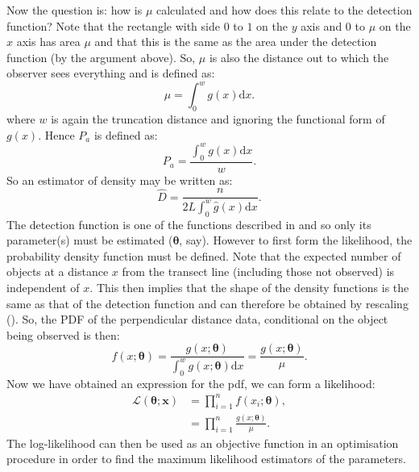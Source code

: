 Now the question is: how is $\mu$ calculated and how does this relate to the detection function? Note that the rectangle with side $0$ to $1$ on the $y$ axis and $0$ to $\mu$ on the $x$ axis has area $\mu$ and that this is the same as the area under the detection function (by the argument above). So, $\mu$ is also the distance out to which the observer sees everything and is defined as:
\begin{equation}
\mu = \int_0^w g(x) \text{d}x.
\label{ds-lt-mu-def}
\end{equation}
where $w$ is again the truncation distance and ignoring the functional form of $g(x)$. Hence $P_a$ is defined as:
\begin{equation*}
P_a = \frac{\int_0^w g(x) \text{d}x}{w}.
\end{equation*}
So an estimator of density may be written as:
\begin{equation*}
\hat{D}=\frac{n}{2L \int_0^w \hat{g}(x) \text{d}x}.
\end{equation*}
The detection function is one of the functions described in  and so only its parameter(s) must be estimated ($\bm{\theta}$, say). However to first form the likelihood, the probability density function must be defined. Note that the expected number of objects at a distance $x$ from the transect line (including those not observed) is independent of $x$. This then implies that the shape of the density functions is the same as that of the detection function and can therefore be obtained by rescaling (\cite[p. 38]{IDS}). So, the PDF of the perpendicular distance data, conditional on the object being observed is then:
\begin{equation*}
f(x;\bm{\theta}) = \frac{g(x;\bm{\theta})}{\int_0^w g(x;\bm{\theta}) \text{d}x} = \frac{g(x;\bm{\theta})}{\mu}.
\end{equation*}
Now we have obtained an expression for the pdf, we can form a likelihood:
\begin{align}
\mathcal{L}(\bm{\theta}; \bm{x}) &= \prod_{i=1}^n f(x_i;\bm{\theta}),\\
&= \prod_{i=1}^n \frac{g(x;\bm{\theta})}{\mu}.
\label{ds-lt-likelihood}
\end{align}
The log-likelihood can then be used as an objective function in an optimisation procedure in order to find the maximum likelihood estimators of the parameters.

